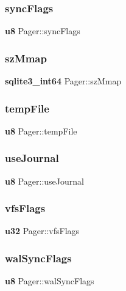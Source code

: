 \subsubsection{syncFlags}
{\footnotesize\ttfamily \textbf{ u8} Pager\+::sync\+Flags}

\mbox{\label{struct_pager_a2e1c04a512708f6df091f6d6246b70d3}} 
\subsubsection{szMmap}
{\footnotesize\ttfamily \textbf{ sqlite3\+\_\+int64} Pager\+::sz\+Mmap}

\mbox{\label{struct_pager_a9caa1abb43f6e839dd9a265c27b0b9e4}} 
\subsubsection{tempFile}
{\footnotesize\ttfamily \textbf{ u8} Pager\+::temp\+File}

\mbox{\label{struct_pager_af7783f866150d7e322c28cb324ad85d6}} 
\subsubsection{useJournal}
{\footnotesize\ttfamily \textbf{ u8} Pager\+::use\+Journal}

\mbox{\label{struct_pager_a36f3333fe82c70a46a99f2f8f289a971}} 
\subsubsection{vfsFlags}
{\footnotesize\ttfamily \textbf{ u32} Pager\+::vfs\+Flags}

\mbox{\label{struct_pager_aa8c8c2d893e4d2165f089ddde3e85103}} 
\subsubsection{walSyncFlags}
{\footnotesize\ttfamily \textbf{ u8} Pager\+::wal\+Sync\+Flags}

\mbox{\label{struct_pager_ae1f5a3f57a0351a2d2f652716c48c463}} 
